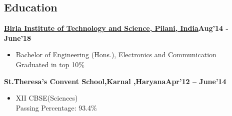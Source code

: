\documentclass[margin,line]{templates/resume}
\newcommand{\compresslist}{%
\setlength{\itemsep}{3pt}%
\setlength{\parskip}{0pt}%
\setlength{\parsep}{0pt}%
}
\begin{document}
\begin{resume}
\section{\mysidestyle Education}
       \textbf{\href{http://www.bits-pilani.ac.in/}{Birla Institute of Technology and Science, Pilani, India}}\hfill{\textbf{Aug'14 - June'18}}
    \begin{itemize}[leftmargin=*]\compresslist
        \item[]Bachelor of Engineering (Hons.), Electronics and Communication
        \textbf\\ Graduated in top 10\%
    \end{itemize}
 \vspace{-0.2cm}
    \textbf{{St.Theresa's Convent School,Karnal ,Haryana}}\hfill{\textbf{Apr'12 -- June'14}}
    \begin{itemize}[leftmargin=*]\compresslist
        \item[]XII CBSE(Sciences)\\
        Passing Percentage: 93.4\%
    \end{itemize}



\vspace{-0.1cm}    

\end{resume}
\end{document}
